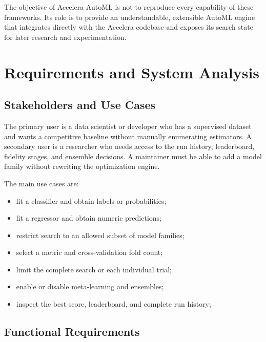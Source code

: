 \documentclass[12pt,a4paper,oneside]{report}
\newcommand{\systemname}{Accelera AutoML}
\begin{document}
\noindent The objective of \systemname{} is not to reproduce every capability
of these frameworks. Its role is to provide an understandable, extensible
AutoML engine that integrates directly with the Accelera codebase and exposes
its search state for later research and experimentation.

\chapter{Requirements and System Analysis}
\label{chap:requirements}

\section{Stakeholders and Use Cases}

The primary user is a data scientist or developer who has a supervised dataset
and wants a competitive baseline without manually enumerating estimators. A
secondary user is a researcher who needs access to the run history,
leaderboard, fidelity stages, and ensemble decisions. A maintainer must be able
to add a model family without rewriting the optimization engine.

\medskip

\noindent The main use cases are:

\begin{itemize}[leftmargin=*]
  \item fit a classifier and obtain labels or probabilities;
  \item fit a regressor and obtain numeric predictions;
  \item restrict search to an allowed subset of model families;
  \item select a metric and cross-validation fold count;
  \item limit the complete search or each individual trial;
  \item enable or disable meta-learning and ensembles;
  \item inspect the best score, leaderboard, and complete run history;
\end{itemize}

\section{Functional Requirements}
\end{document}
